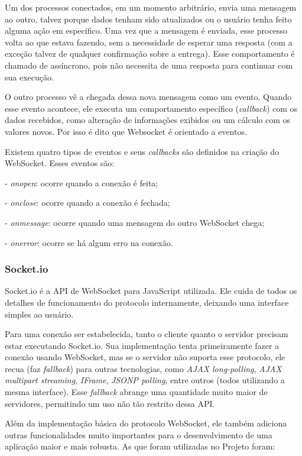 \documentclass[a4paper,12pt]{article}
\begin{document}
Um dos processos conectados, em um momento arbitrário, envia uma mensagem ao outro, talvez porque dados tenham sido atualizados ou o usuário tenha feito alguma ação em específico. Uma vez que a mensagem é enviada, esse processo volta ao que estava fazendo, sem a necessidade de esperar uma resposta (com a exceção talvez de qualquer confirmação sobre a entrega). Esse comportamento é chamado de assíncrono, pois não necessita de uma resposta para continuar com sua execução.

O outro processo vê a chegada dessa nova mensagem como um evento. Quando esse evento acontece, ele executa um comportamento específico (\emph{callback}) com os dados recebidos, como alteração de informações exibidos ou um cálculo com os valores novos. Por isso é dito que Websocket é orientado a eventos.

Existem quatro tipos de eventos e seus \emph{callbacks} são definidos na criação do WebSocket. Esses eventos são:

- \emph{onopen}: ocorre quando a conexão é feita;

- \emph{onclose}: ocorre quando a conexão é fechada;

- \emph{onmessage}: ocorre quando uma mensagem do outro WebSocket chega;

- \emph{onerror}: ocorre se há algum erro na conexão.


\subsubsection{Socket.io}

Socket.io é a API de WebSocket para JavaScript utilizada. Ele cuida de todos os detalhes de funcionamento do protocolo internamente, deixando uma interface simples ao usuário.

Para uma conexão ser estabelecida, tanto o cliente quanto o servidor precisam estar executando Socket.io. Sua implementação tenta primeiramente fazer a conexão usando WebSocket, mas se o servidor não suporta esse protocolo, ele recua (faz \emph{fallback}) para outras tecnologias, como \emph{AJAX long-polling}, \emph{AJAX multipart streaming}, \emph{IFrame}, \emph{JSONP polling}, entre outros (todos utilizando a mesma interface). Esse \emph{fallback} abrange uma quantidade muito maior de servidores, permitindo um uso não tão restrito dessa API.

Além da implementação básica do protocolo WebSocket, ele também adiciona outras funcionalidades muito importantes para o desenvolvimento de uma aplicação maior e mais robusta. As que foram utilizadas no Projeto foram:
\end{document}
